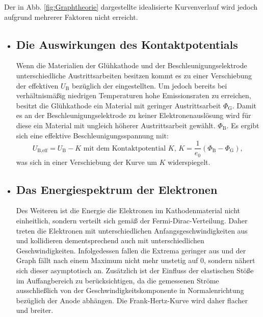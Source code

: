 Der in Abb. \ref{fig:Graphtheorie} dargestellte idealisierte Kurvenverlauf wird jedoch
aufgrund mehrerer Faktoren nicht erreicht.


\begin{itemize}
  \item \subsection{Die Auswirkungen des Kontaktpotentials}
  Wenn die Materialien der Glühkathode und der Beschleunigungselektrode unterschiedliche
  Austrittsarbeiten besitzen kommt es zu einer Verschiebung der effektiven $U_\text{B}$ bezüglich der
  eingestellten. Um jedoch bereits bei verhältnismäßig niedrigen Temperaturen hohe Emissionsraten
  zu erreichen, besitzt die Glühkathode ein Material mit geringer Austrittsarbeit $\Phi_\text{G}$.
  Damit es an der Beschleunigungselektrode zu keiner Elektronenauslösung wird
  für diese ein Material mit ungleich höherer Austrittsarbeit gewählt.
  $\Phi_\text{B}$. Es ergibt sich eine effektive Beschleunigungsspannung mit:
  \begin{equation}
    U_\text{B,eff} = U_\text{B} - K \text{ mit dem Kontaktpotential }K\text{, } K = \frac{1}{e_0}\left(\Phi_\text{B} - \Phi _\text{G} \right)\text{, }\label{eq:kontakt}
  \end{equation}
was sich in einer Verschiebung der Kurve um $K$ widerspiegelt.

\item \subsection{Das Energiespektrum der Elektronen}
Des Weiteren ist die Energie die Elektronen im Kathodenmaterial nicht einheitlich, sondern
verteilt sich gemäß der Fermi-Dirac-Verteilung. Daher treten die Elektronen mit
unterschiedlichen Anfangsgeschwindigkeiten aus und kollidieren dementsprechend
auch mit unterschiedlichen Geschwindigkeiten. %
Infolgedessen fallen die Extrema geringer aus und der Graph fällt nach einem
Maximum nicht mehr unstetig auf 0, sondern nähert sich dieser asymptotisch an. Zusätzlich
ist der Einfluss der elastischen Stöße im Auffangbereich zu berücksichtigen, da die gemessenen
Ströme ausschließlich von der Geschwindigkeitskomponente in Normalenrichtung bezüglich
der Anode abhängen. %
Die Frank-Hertz-Kurve wird daher flacher und breiter.



\end{itemize}
